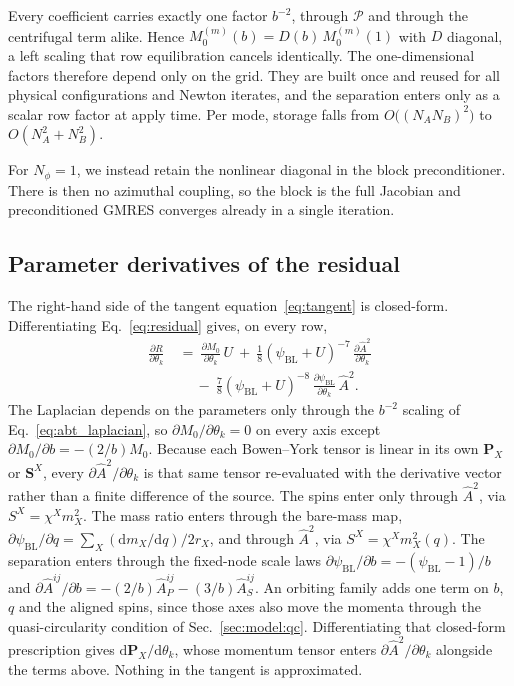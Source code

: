 \documentclass[
  aps,
  prd,
  twocolumn,
  10pt,
  amsmath,
  amssymb,
  nofootinbib,
  superscriptaddress,
  floatfix,
]{revtex4-2}
\newcommand{\vect}[1]{\boldsymbol{#1}}
\newcommand{\psiBL}{\psi_{\mathrm{BL}}}
\newcommand{\Ahat}{\hat{A}}
\begin{document}
Every coefficient carries exactly one factor $b^{-2}$, through
$\mathcal{P}$ and through the centrifugal term alike.
Hence $M_0^{(m)}(b)=D(b)\,M_0^{(m)}(1)$ with $D$ diagonal, a left scaling
that row equilibration cancels identically.
The one-dimensional factors therefore depend only on the grid.
They are built once and reused for all physical configurations and Newton iterates, and the separation enters only as a scalar row factor at apply time.
Per mode, storage falls from $O\big((N_AN_B)^2\big)$ to $O(N_A^2+N_B^2)$.

For $N_\phi=1$, we instead retain the nonlinear diagonal in the block
preconditioner. There is then no azimuthal coupling, so the block is the full
Jacobian and preconditioned GMRES converges already in a single iteration.

\subsection{Parameter derivatives of the residual}
\label{sec:solverdetails:tangent}

The right-hand side of the tangent equation~\eqref{eq:tangent} is closed-form.
Differentiating Eq.~\eqref{eq:residual} gives, on every row,
\begin{equation}
\begin{aligned}
  \frac{\partial R}{\partial\theta_k} \ &= \ \frac{\partial M_0}{\partial\theta_k}\,U
  \ + \ \tfrac{1}{8}(\psiBL+U)^{-7}\,\frac{\partial\Ahat^2}{\partial\theta_k} \\
  &\quad \ - \ \tfrac{7}{8}(\psiBL+U)^{-8}\,\frac{\partial\psiBL}{\partial\theta_k}\,\Ahat^2 .
\end{aligned}
  \label{eq:dR_dtheta}
\end{equation}
The Laplacian depends on the parameters only through the $b^{-2}$ scaling of Eq.~\eqref{eq:abt_laplacian}, so $\partial M_0/\partial\theta_k=0$ on every axis except $\partial M_0/\partial b=-(2/b)M_0$.
Because each Bowen--York tensor is
linear in its own $\vect{P}_X$ or $\vect{S}^{X}$, every $\partial\Ahat^2/\partial\theta_k$
is that same tensor re-evaluated with the derivative vector rather than a finite
difference of the source.
The spins enter only through $\Ahat^2$, via $S^{X} = \chi^{X} m_X^2$.
The mass ratio enters through the bare-mass map, $\partial\psiBL/\partial q = \sum_X (\mathrm{d}m_X/\mathrm{d}q)/2r_X$, and through $\Ahat^2$, via $S^{X} = \chi^{X} m_X^2(q)$.
The separation enters through the fixed-node scale laws $\partial\psiBL/\partial b = -(\psiBL-1)/b$ and
$\partial\Ahat^{ij}/\partial b = -(2/b)\Ahat^{ij}_{P}-(3/b)\Ahat^{ij}_{S}$.
An orbiting family adds one term on $b$, $q$
and the aligned spins, since those axes also move the momenta through the
quasi-circularity condition of Sec.~\ref{sec:model:qc}.
Differentiating that closed-form prescription gives $\mathrm{d}\vect{P}_X/\mathrm{d}\theta_k$, whose momentum tensor
enters $\partial\Ahat^2/\partial\theta_k$ alongside the terms above. Nothing in the
tangent is approximated.
\end{document}

